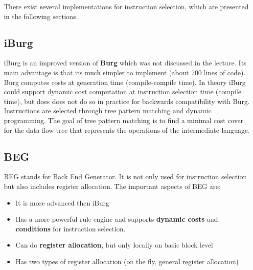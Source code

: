 \documentclass[a4paper,10pt]{article}
\begin{document}
There exist several implementations for instruction selection, which are presented in the following sections.
\subsection{iBurg}
iBurg is an improved version of \textbf{Burg} which was not discussed in the lecture. Its main advantage is that its much 
       simpler to implement (about 700 lines of code). Burg computes costs at generation time (compile-compile time). In theory iBurg 
       could support dynamic cost computation at instruction selection time (compile time), but does does not do so in practice for 
       backwards compatibility with Burg. Instructions are selected through tree pattern matching and dynamic programming. The goal of 
       tree pattern matching is to find a minimal cost cover for the data flow tree that represents the operations of the intermediate 
       language.

\subsection{BEG}
BEG stands for Back End Generator. It is not only used for instruction selection but also includes register allocation. The important 
aspects of BEG are:
\begin{itemize}
    \item It is more advanced then iBurg
    \item Has a more powerful rule engine and supports \textbf{dynamic costs} and \textbf{conditions} for instruction selection. 
    \item Can do \textbf{register allocation}, but only locally on basic block level
    \item Has two types of register allocation (on the fly, general register allocation)
\end{itemize}
\end{document}
